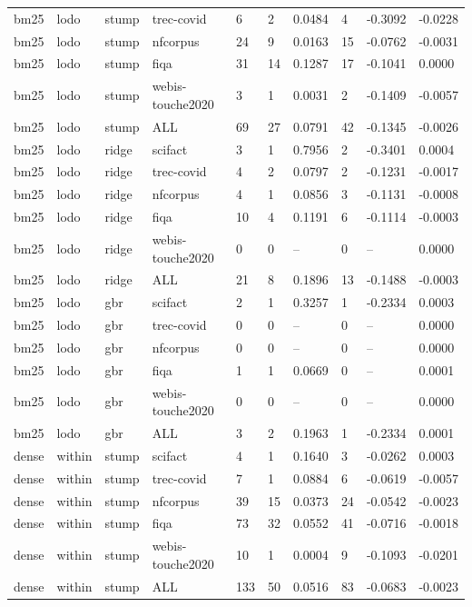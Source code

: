 \begin{table}[t]
\begin{tabular}{llllllllll}
bm25 & lodo & stump & trec-covid & 6 & 2 & 0.0484 & 4 & -0.3092 & -0.0228 \\
bm25 & lodo & stump & nfcorpus & 24 & 9 & 0.0163 & 15 & -0.0762 & -0.0031 \\
bm25 & lodo & stump & fiqa & 31 & 14 & 0.1287 & 17 & -0.1041 & 0.0000 \\
bm25 & lodo & stump & webis-touche2020 & 3 & 1 & 0.0031 & 2 & -0.1409 & -0.0057 \\
bm25 & lodo & stump & ALL & 69 & 27 & 0.0791 & 42 & -0.1345 & -0.0026 \\
bm25 & lodo & ridge & scifact & 3 & 1 & 0.7956 & 2 & -0.3401 & 0.0004 \\
bm25 & lodo & ridge & trec-covid & 4 & 2 & 0.0797 & 2 & -0.1231 & -0.0017 \\
bm25 & lodo & ridge & nfcorpus & 4 & 1 & 0.0856 & 3 & -0.1131 & -0.0008 \\
bm25 & lodo & ridge & fiqa & 10 & 4 & 0.1191 & 6 & -0.1114 & -0.0003 \\
bm25 & lodo & ridge & webis-touche2020 & 0 & 0 & -- & 0 & -- & 0.0000 \\
bm25 & lodo & ridge & ALL & 21 & 8 & 0.1896 & 13 & -0.1488 & -0.0003 \\
bm25 & lodo & gbr & scifact & 2 & 1 & 0.3257 & 1 & -0.2334 & 0.0003 \\
bm25 & lodo & gbr & trec-covid & 0 & 0 & -- & 0 & -- & 0.0000 \\
bm25 & lodo & gbr & nfcorpus & 0 & 0 & -- & 0 & -- & 0.0000 \\
bm25 & lodo & gbr & fiqa & 1 & 1 & 0.0669 & 0 & -- & 0.0001 \\
bm25 & lodo & gbr & webis-touche2020 & 0 & 0 & -- & 0 & -- & 0.0000 \\
bm25 & lodo & gbr & ALL & 3 & 2 & 0.1963 & 1 & -0.2334 & 0.0001 \\
dense & within & stump & scifact & 4 & 1 & 0.1640 & 3 & -0.0262 & 0.0003 \\
dense & within & stump & trec-covid & 7 & 1 & 0.0884 & 6 & -0.0619 & -0.0057 \\
dense & within & stump & nfcorpus & 39 & 15 & 0.0373 & 24 & -0.0542 & -0.0023 \\
dense & within & stump & fiqa & 73 & 32 & 0.0552 & 41 & -0.0716 & -0.0018 \\
dense & within & stump & webis-touche2020 & 10 & 1 & 0.0004 & 9 & -0.1093 & -0.0201 \\
dense & within & stump & ALL & 133 & 50 & 0.0516 & 83 & -0.0683 & -0.0023 \\

\end{tabular}
\end{table}
